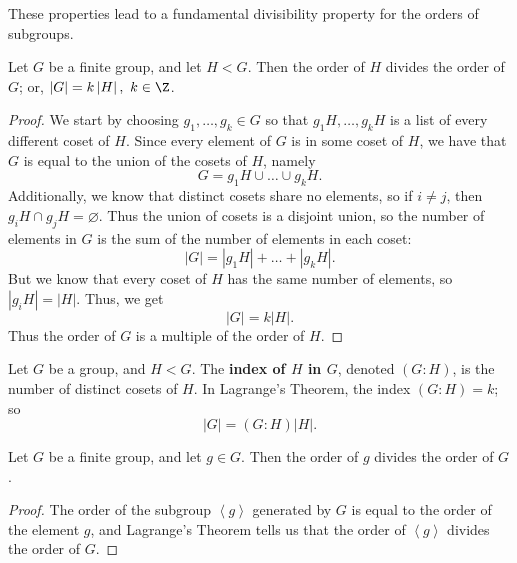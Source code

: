 \documentclass[math1530-lecture-notes]{subfiles}
\begin{document}
These properties lead to a fundamental divisibility property for the orders of subgroups.
\begin{theorem}{}
  Let $G$ be a finite group, and let $H<G$. Then the order of $H$ divides the order of $G$; or,
  $\left| G \right| = k \left| H \right|,\ k\in \Z $.
\end{theorem}
\begin{proof}[Proof]
  We start by choosing $g_1,\ldots,g_k\in G$ so that $g_1H,\ldots,g_kH$ is a list of every different
  coset of $H$. Since every element of $G$ is in some coset of $H$, we have that $G$ is equal to the
  union of the cosets of $H$, namely \[
    G = g_1H \cup \ldots \cup g_kH
  .\] Additionally, we know that distinct cosets share no elements, so if $i\neq j$, then $g_iH\cap
  g_jH=\varnothing$. Thus the union of cosets is a disjoint union, so the number of elements in $G$ 
  is the sum of the number of elements in each coset: \[
    \left| G \right| = \left| g_1H \right| +\ldots+\left| g_kH \right| 
  .\] But we know that every coset of $H$ has the same number of elements, so $\left| g_iH \right|
  =\left| H \right| $. Thus, we get \[
  \left| G \right| = k\left| H \right| 
  .\] Thus the order of $G$ is a multiple of the order of $H$.
\end{proof}
\begin{definition}[Index]{}
  Let $G$ be a group, and $H<G$. The \textbf{index of $H$ in $G$}, denoted $(G : H)$, is the number
  of distinct cosets of $H$. In Lagrange's Theorem, the index $(G : H) = k$; so \[
    \left| G \right| = (G : H) \left| H \right| 
  .\] 
\end{definition}

\begin{corollary}{}
  Let $G$ be a finite group, and let $g\in G$. Then the order of $g$ divides the order of $G$.
\end{corollary}
\begin{proof}[Proof]
  The order of the subgroup $\left<g \right>$ generated by $G$ is equal to the order of the element
  $g$, and Lagrange's Theorem tells us that the order of $\left<g \right>$ divides the order of $G$.
\end{proof}
\end{document}
